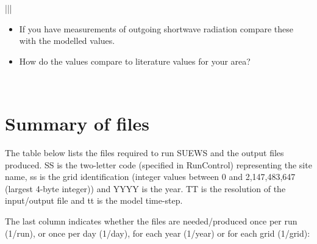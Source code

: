 \documentclass[letterpaper,10pt,english]{sphinxmanual}
\begin{document}
\begin{savenotes}
\begin{tabular}[t]{|||}
\begin{description}
\begin{itemize}
\item {} 
If you have measurements of outgoing shortwave radiation compare these with the modelled values.

\item {} 
How do the values compare to literature values for your area?

\end{itemize}

\end{description}
\\
\hline
\end{tabular}
\par
\sphinxattableend\end{savenotes}


\section{Summary of files}
\label{\detokenize{prepare-to-run-the-model:summary-of-files}}
The table below lists the files required to run SUEWS and the output
files produced. SS is the two-letter code (specified in RunControl)
representing the site name, ss is the grid identification (integer
values between 0 and 2,147,483,647 (largest 4-byte integer)) and YYYY is
the year. TT is the resolution of the input/output file and tt is the
model time-step.

The last column indicates whether the files are needed/produced once per
run (1/run), or once per day (1/day), for each year (1/year) or for each
grid (1/grid):

%
\begin{sphinxVerbatim}[commandchars=\\\{\}]
\PYG{p}{[}\PYG{p}{]}                    
\PYG{p}{[}\PYG{p}{]}                   
\end{sphinxVerbatim}
\end{document}
